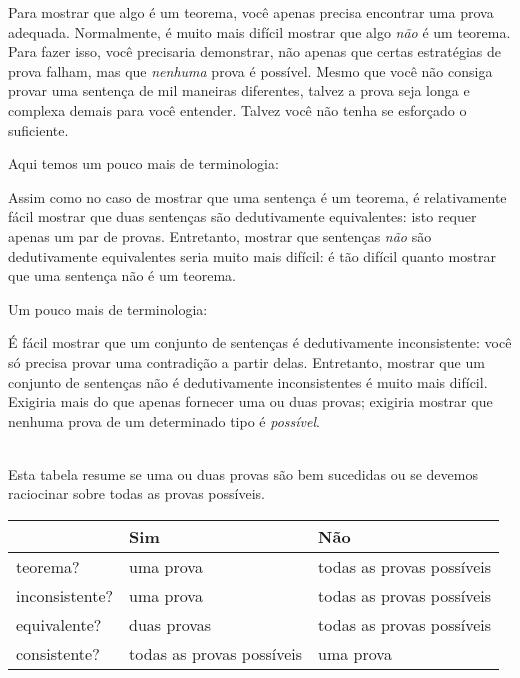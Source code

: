 Para mostrar que algo \'e um teorema, voc\^e apenas precisa encontrar uma prova adequada. Normalmente, \'e muito mais dif\'icil mostrar que algo \emph{n\~ao} \'e um teorema. Para fazer isso, voc\^e precisaria demonstrar, n\~ao apenas que certas estrat\'egias de prova falham, mas que \emph{nenhuma} prova \'e poss\'ivel. Mesmo que voc\^e n\~ao consiga provar uma senten\c ca de mil maneiras diferentes, talvez a prova seja longa e complexa demais para voc\^e entender. Talvez voc\^e n\~ao tenha se esfor\c cado o suficiente.

Aqui temos um pouco mais de terminologia:

Assim como no caso de mostrar que uma senten\c ca \'e um teorema, \'e relativamente f\'acil mostrar que duas senten\c cas s\~ao dedutivamente equivalentes: isto requer apenas um par de provas. Entretanto, mostrar que senten\c cas \emph{n\~ao} s\~ao dedutivamente equivalentes seria muito mais dif\'icil: \'e t\~ao dif\'icil quanto mostrar que uma senten\c ca n\~ao \'e um teorema.

Um pouco mais de terminologia:
        
        \'E f\'acil mostrar que um conjunto de senten\c cas \'e dedutivamente inconsistente: voc\^e s\'o precisa provar uma contradi\c c\~ao a partir delas.  Entretanto,  mostrar que um conjunto de senten\c cas n\~ao \'e dedutivamente inconsistentes \'e muito mais dif\'icil. Exigiria mais do que apenas fornecer uma ou duas provas; exigiria mostrar que nenhuma prova de um determinado tipo \'e \emph{poss\'ivel}.

\
\\
Esta tabela resume se uma ou duas provas s\~ao bem sucedidas ou se devemos raciocinar sobre todas as provas poss\'iveis.
{\small
\begin{center}
\begin{tabular}{l l l}
 & \textbf{Sim} & \textbf{ N\~ao}\\
 \hline
teorema? & uma prova & todas as provas poss\'iveis\\
inconsistente? &  uma prova  & todas as provas poss\'iveis\\
equivalente? & duas provas & todas as provas poss\'iveis\\
consistente? & todas as provas poss\'iveis & uma prova\\
\end{tabular}
\end{center}}

